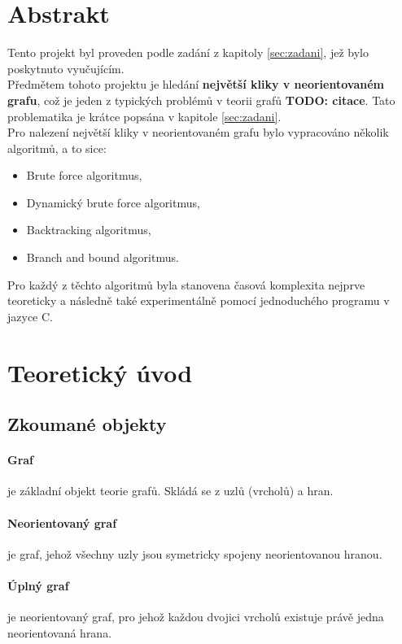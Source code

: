 \documentclass[a4paper]{article}
\begin{document}
\section{Abstrakt} \label{sec:abstrakt}
Tento projekt byl proveden podle zadání z kapitoly \ref{sec:zadani}, jež bylo poskytnuto vyučujícím.\\

\noindent
Předmětem tohoto projektu je hledání \textbf{největší kliky v neorientovaném grafu}, což je jeden z typických problémů v teorii grafů \textbf{TODO: citace}. Tato problematika je krátce popsána v kapitole \ref{sec:zadani}.\\

\noindent
Pro nalezení největší kliky v neorientovaném grafu bylo vypracováno několik algoritmů, a to sice:
\begin{itemize}
    \item Brute force algoritmus,
    \item Dynamický brute force algoritmus,
    \item Backtracking algoritmus,
    \item Branch and bound algoritmus.
\end{itemize}
Pro každý z těchto algoritmů byla stanovena časová komplexita nejprve teoreticky a následně také experimentálně pomocí jednoduchého programu v jazyce C.

\section{Teoretický úvod} \label{sec:teorie}
\subsection{Zkoumané objekty}
\paragraph{Graf} je základní objekt teorie grafů. Skládá se z uzlů (vrcholů) a hran.\cite{slu_zaklad-teo-grafu}

\paragraph{Neorientovaný graf}
je graf, jehož všechny uzly jsou symetricky spojeny neorientovanou hranou.\cite{slu_zaklad-teo-grafu}

\paragraph{Úplný graf} je neorientovaný graf, pro jehož každou dvojici vrcholů existuje právě jedna neorientovaná hrana.\cite{slu_zaklad-teo-grafu}

\paragraph{}



\end{document}
